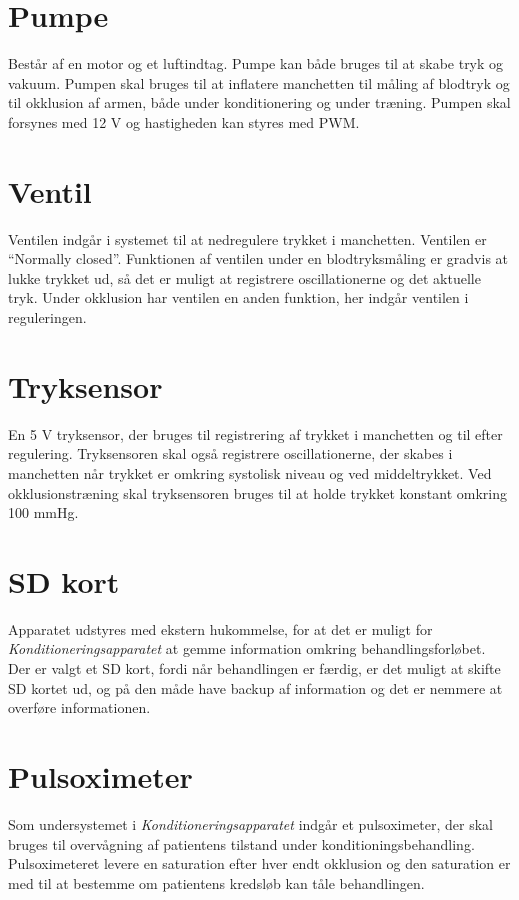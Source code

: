 \section{Pumpe}
Består af en motor og et luftindtag. Pumpe kan både bruges til at skabe tryk og vakuum. Pumpen skal bruges til at inflatere manchetten til måling af blodtryk og til okklusion af armen, både under konditionering og under træning. Pumpen skal forsynes med 12 V og hastigheden kan styres med PWM. 

\section{Ventil}
Ventilen indgår i systemet til at nedregulere trykket i manchetten. Ventilen er “Normally closed”. Funktionen af ventilen under en blodtryksmåling er gradvis at lukke trykket ud, så det er muligt at registrere oscillationerne og det aktuelle tryk. Under okklusion har ventilen en anden funktion, her indgår ventilen i reguleringen.

\section{Tryksensor}
En 5 V tryksensor, der bruges til registrering af trykket i manchetten og til efter regulering. Tryksensoren skal også registrere oscillationerne, der skabes i manchetten når trykket er omkring systolisk niveau og ved middeltrykket. Ved okklusionstræning skal tryksensoren bruges til at holde trykket konstant omkring 100 mmHg.

\section{SD kort}
Apparatet udstyres med ekstern hukommelse, for at det er muligt for \textit{Konditioneringsapparatet} at gemme information omkring behandlingsforløbet. Der er valgt et SD kort, fordi når behandlingen er færdig, er det muligt at skifte SD kortet ud, og på den måde have backup af information og det er nemmere at overføre informationen. 

\section{Pulsoximeter}
Som undersystemet i \textit{Konditioneringsapparatet} indgår et pulsoximeter, der skal bruges til overvågning af patientens tilstand under konditioningsbehandling. Pulsoximeteret levere en saturation efter hver endt okklusion og den saturation er med til at bestemme om patientens kredsløb kan tåle behandlingen.
